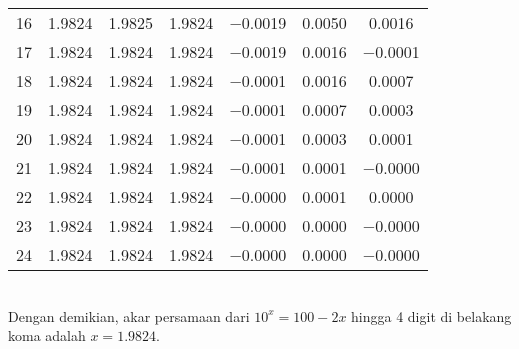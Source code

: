 \documentclass{article}
\begin{document}
\begin{enumerate}
\begin{enumerate}
\begin{tabular}{|c|c|c|c|c|c|c|}
            16 & \num{1,9824} & \num{1,9825} & \num{1,9824} & \num{-0,0019} & \num{0,0050} & \num{0,0016}\\
            17 & \num{1,9824} & \num{1,9824} & \num{1,9824} & \num{-0,0019} & \num{0,0016} & \num{-0,0001}\\
            18 & \num{1,9824} & \num{1,9824} & \num{1,9824} & \num{-0,0001} & \num{0,0016} & \num{0,0007}\\
            19 & \num{1,9824} & \num{1,9824} & \num{1,9824} & \num{-0,0001} & \num{0,0007} & \num{0,0003}\\
            20 & \num{1,9824} & \num{1,9824} & \num{1,9824} & \num{-0,0001} & \num{0,0003} & \num{0,0001}\\
            21 & \num{1,9824} & \num{1,9824} & \num{1,9824} & \num{-0,0001} & \num{0,0001} & \num{-0,0000}\\
            22 & \num{1,9824} & \num{1,9824} & \num{1,9824} & \num{-0,0000} & \num{0,0001} & \num{0,0000}\\
            23 & \num{1,9824} & \num{1,9824} & \num{1,9824} & \num{-0,0000} & \num{0,0000} & \num{-0,0000}\\
            24 & \num{1,9824} & \num{1,9824} & \num{1,9824} & \num{-0,0000} & \num{0,0000} & \num{-0,0000}\\
             \hline
            \end{tabular} \\           
        Dengan demikian, akar persamaan dari $10^x = 100 - 2x$ hingga 4 digit di belakang koma adalah $x = \num{1,9824}$.


\end{enumerate}
\end{enumerate}
\end{document}
